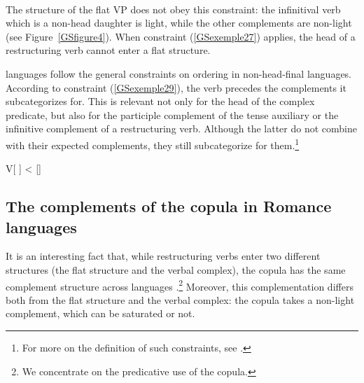 \ea	
\label{GSexemple27}
 \impl\\
\z
The structure of the flat VP does not obey this constraint: the infinitival verb which is a non-head
daughter is light, while the other complements are non-light (see Figure~\ref{GSfigure4}). When
constraint (\ref{GSexemple27}) applies, the head of a restructuring verb cannot enter a flat
structure.  


\largerpage[-1]
 languages follow the general constraints on ordering in non-head-final
languages. According to constraint (\ref{GSexemple29}), the verb precedes the complements it
subcategorizes for. This is relevant not only for the head of the complex predicate, but also for
the participle complement of the tense auxiliary or the infinitive complement of a restructuring
verb. Although the latter do not combine with their expected complements, they still subcategorize
for them.\footnote{
  For more on the definition of such constraints, see .
} 

\ea
V[\comps {} ] < [\synsem {}]
	\label{GSexemple29}
\z

\subsection{The complements of the copula in Romance languages}\label{GSsection3.4}\label{cp:sec-copula-romance}

It is an interesting fact that, while  restructuring verbs enter two different structures (the flat structure and the verbal complex), the copula has the same complement structure across  languages \citep{abeille2001varieties, AG2010}.\footnote{We concentrate on the predicative use of the copula.} Moreover, this complementation differs both from the flat structure and the verbal complex: the copula takes a non-light complement, which can be saturated or not. 

